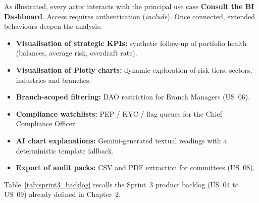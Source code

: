As illustrated, every actor interacts with the principal use case
\textbf{Consult the BI Dashboard}. Access requires authentication
(\textit{include}). Once connected, extended behaviours deepen the analysis:
\begin{itemize}
    \item \textbf{Visualisation of strategic KPIs:} synthetic follow-up of portfolio
          health (balances, average risk, overdraft rate).
    \item \textbf{Visualisation of Plotly charts:} dynamic exploration of risk tiers,
          sectors, industries and branches.
    \item \textbf{Branch-scoped filtering:} DAO restriction for Branch Managers
          (US~06).
    \item \textbf{Compliance watchlists:} PEP / KYC / flag queues for the Chief
          Compliance Officer.
    \item \textbf{AI chart explanations:} Gemini-generated textual readings with a
          deterministic template fallback.
    \item \textbf{Export of audit packs:} CSV and PDF extraction for committees
          (US~08).
\end{itemize}

Table~\ref{tab:sprint3_backlog} recalls the Sprint~3 product backlog (US~04 to
US~09) already defined in Chapter~2.

\begin{table}[H]
\centering
\caption{Product Backlog for Sprint~3 (Release~2)}
\label{tab:sprint3_backlog}
\renewcommand{\arraystretch}{1.35}
\end{table}


